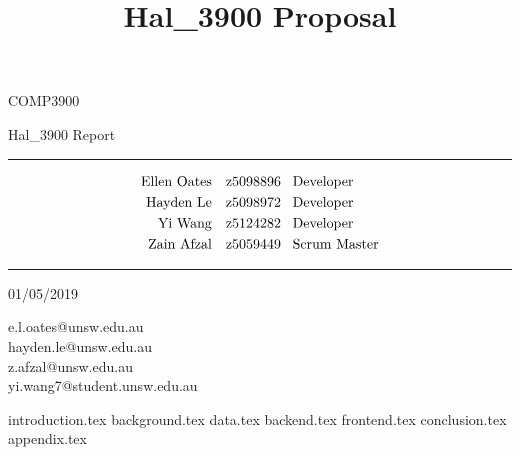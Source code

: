 \documentclass{article}
\title{Hal\_3900 Proposal}
\begin{document}
\begin{LARGE}
\begin{center}
\vspace*{15mm}

COMP3900

Hal\_3900 Report

\rule[4.5pt]{0.8\textwidth}{0.3pt}

\begin{align*}
  \text{Ellen Oates}  \quad &\text{z5098896 \enspace Developer} \\
  \text{Hayden Le}    \quad &\text{z5098972 \enspace Developer} \\
  \text{Yi Wang}      \quad &\text{z5124282 \enspace Developer} \\
  \text{Zain Afzal}   \quad &\text{z5059449 \enspace Scrum Master}
\end{align*}

\vspace*{8mm}
\rule[4.5pt]{0.8\textwidth}{0.3pt}

01/05/2019

\end{center}
\end{LARGE}

\vfill
\small{e.l.oates@unsw.edu.au}\\
\small{hayden.le@unsw.edu.au}\\
\small{z.afzal@unsw.edu.au}\\
\small{yi.wang7@student.unsw.edu.au}

\newpage
\tableofcontents 
\newpage

{introduction.tex}
{background.tex}
{data.tex}
{backend.tex}
{frontend.tex}
{conclusion.tex}
{appendix.tex}
\end{document}
